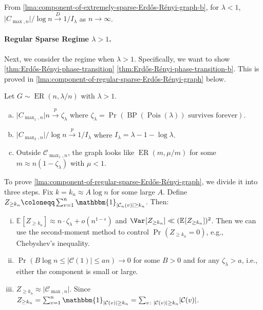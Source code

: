 \begin{note}
	From \autoref{lma:component-of-extremely-sparse-Erdős-Rényi-graph-b}, for \(\lambda < 1\), \(\lvert C_{\max , n} \rvert / \log n \overset{D}{\to} 1 / I_\lambda \) as \(n \to \infty \).
\end{note}

\paragraph{Regular Sparse Regime \(\lambda > 1\).}
Next, we consider the regime when \(\lambda > 1\). Specifically, we want to show \autoref{thm:Erdős-Rényi-phase-transition} \autoref{thm:Erdős-Rényi-phase-transition-b}. This is proved in \autoref{lma:component-of-regular-sparse-Erdős-Rényi-graph} below.

\begin{lemma}\label{lma:component-of-regular-sparse-Erdős-Rényi-graph}
	Let \(G \sim \operatorname{ER}(n, \lambda / n) \) with \(\lambda > 1\).
	\begin{enumerate}[(a)]
		\item\label{lma:component-of-regular-sparse-Erdős-Rényi-graph-a} \(\lvert C_{\max _1, n} \rvert n \overset{p}{\to} \zeta _\lambda\) where \(\zeta _\lambda = \Pr_{}(\operatorname{BP}(\operatorname{Pois}(\lambda ) ) \text{ survives forever} ) \).
		\item\label{lma:component-of-regular-sparse-Erdős-Rényi-graph-b} \(\lvert C_{\max _2, n} \rvert / \log n \overset{p}{\to} 1 / I_\lambda \) where \(I_\lambda = \lambda - 1 - \log \lambda \).
		\item\label{lma:component-of-regular-sparse-Erdős-Rényi-graph-c} Outside \(\mathcal{C} _{\max _1, n}\), the graph looks like \(\operatorname{ER}(m, \mu / m) \) for some \(m \approx n (1 - \zeta _\lambda )\) with \(\mu < 1\).
	\end{enumerate}
\end{lemma}

To prove \autoref{lma:component-of-regular-sparse-Erdős-Rényi-graph}, we divide it into three steps. Fix \(k = k_n \approx A \log n\) for some large \(A\). Define \(Z_{\geq k_n} \coloneqq \sum_{v=1}^{n} \mathbbm{1}_{\lvert \mathcal{C} _n(v) \rvert \geq k_n} \). Then:
\begin{enumerate}[(i)]
	\item \(\mathbb{E}_{}[Z_{\geq k_n}] \approx n \cdot \zeta _\lambda + o(n^{1 - \epsilon })\) and \(\Var_{}[Z_{\geq k_n}] \ll (\mathbb{E}_{}[Z_{\geq k_n}] )^2\). Then we can use the second-moment method to control \(\Pr_{}(Z_{\geq k_n} = 0) \), e.g., Chebyshev's inequality.
	\item \(\Pr_{}(B \log n \leq \lvert \mathcal{C} (1) \rvert \leq a n) \to 0\) for some \(B > 0\) and for any \(\zeta _\lambda > a\), i.e., either the component is small or large.
	\item \(Z_{\geq k_n} \approx \lvert \mathcal{C} _{\max , n} \rvert \). Since \(Z_{\geq k_n} = \sum_{v=1}^{n} \mathbbm{1}_{\lvert \mathcal{C} (v) \rvert \geq k_n} = \sum_{v \colon \lvert \mathcal{C} (v) \rvert \geq k_n } \lvert \mathcal{C} (v) \rvert \).
\end{enumerate}

